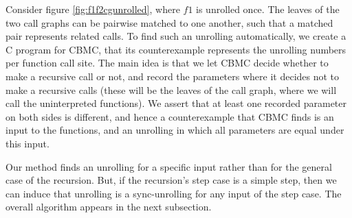 Consider figure \ref{fig:f1f2cgunrolled}, where $f1$ is unrolled once. The leaves of the two call graphs can be pairwise matched to one another, such that a matched pair represents related calls. To find such an unrolling automatically, we create a C program for CBMC, that its counterexample represents the unrolling numbers per function call site. The main idea is that we let CBMC decide whether to make a recursive call or not, and record the parameters where it decides not to make a recursive calls (these will be the leaves of the call graph, where we will call the uninterpreted functions). We assert that at least one recorded parameter on both sides is different, and hence a counterexample that CBMC finds is an input to the functions, and an unrolling in which all parameters are equal under this input. 


Our method finds an unrolling for a specific input rather than for the general case of the recursion. But, if the recursion's step case is a simple step, then we can induce that unrolling is a sync-unrolling for any input of the step case.
The overall algorithm appears in the next subsection. 

